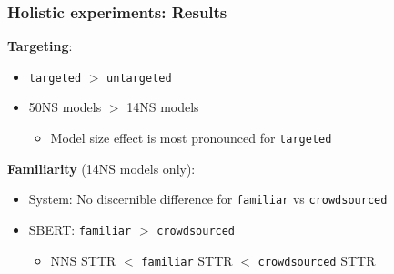 \documentclass[handout,xcolor={dvipsnames}]{beamer}
\newcommand{\param}[1]{\texttt{#1}}
\begin{document}
\begin{frame}
\frametitle{Holistic experiments: Results}

\vspace{-.5em}

\pause
\textbf{Targeting}:
\begin{itemize}
\pause
\item \param{targeted} $>$ \param{untargeted}
\pause
\item 50NS models $>$ 14NS models
\begin{itemize}
\pause
\item Model size effect is most pronounced for \param{targeted}
\end{itemize}
\end{itemize}

\vspace{1em}

\pause
\textbf{Familiarity} (14NS models only):
\begin{itemize}
\pause
\item System: No discernible difference for \param{familiar} vs \param{crowdsourced}
\pause
\item SBERT: \param{familiar} $>$ \param{crowdsourced}
\begin{itemize}
\pause
\item NNS STTR $<$ \param{familiar} STTR $<$ \param{crowdsourced} STTR
\end{itemize}
\end{itemize}

\end{frame}
\end{document}
